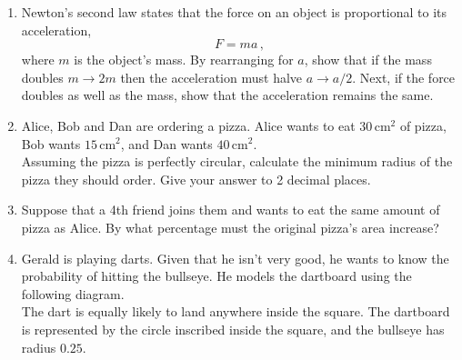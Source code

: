 \documentclass[12pt,a4paper]{article}
\begin{document}
\begin{enumerate}
\vspace{3cm}

    \item Newton's second law states that the force on an object is proportional to its acceleration,
  \begin{equation} 
   F = ma \, , 
  \end{equation}
where $m$ is the object's mass. By rearranging for $a$, show that if the mass doubles $m \to 2m$ then the acceleration must halve $a \to a/2$. Next, if the force doubles as well as the mass, show that the acceleration remains the same.
    \vspace{3cm}

    \item Alice, Bob and Dan are ordering a pizza. Alice wants to eat $30\,\text{cm}^2$ of pizza, Bob wants $15\,\text{cm}^2$, and Dan wants $40\,\text{cm}^2$.\\
    
Assuming the pizza is perfectly circular, calculate the minimum radius of the pizza they should order. Give your answer to 2 decimal places.

    \vspace{3cm}

    \item Suppose that a 4th friend joins them and wants to eat the same amount of pizza as Alice. By what percentage must the original pizza's area increase?

    \vspace{3cm}

    \item Gerald is playing darts. Given that he isn't very good, he wants to know the probability of hitting the bullseye. He models the dartboard using the following diagram. \\

The dart is equally likely to land anywhere inside the square. The dartboard is represented by the circle inscribed inside the square, and the bullseye has radius $0.25$.

\begin{center}

\end{center}
\end{enumerate}
\end{document}
